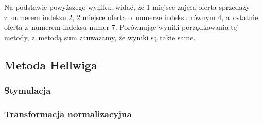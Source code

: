 \documentclass[12pt,a4paper]{report}
\begin{document}
{Na podstawie powyższego wyniku, widać, że 1 miejsce zajęła oferta
sprzedaży z~numerem indeksu 2, 2 miejsce oferta o~numerze indeksu równym 4, a~ostatnie oferta z~numerem indeksu numer 7. Porównując wyniki porządkowania tej metody, z~metodą sum zauważamy, że wyniki są takie same. 

\subsection{Metoda Hellwiga}
\subsubsection{Stymulacja} 
\begin{Shaded}
\begin{Highlighting}[]
\NormalTok{)} 
\end{Highlighting}
\end{Shaded}
\subsubsection{Transformacja normalizacyjna}
\begin{Shaded}
\begin{Highlighting}[]
\end{Highlighting}
\end{Shaded}
}
\end{document}
